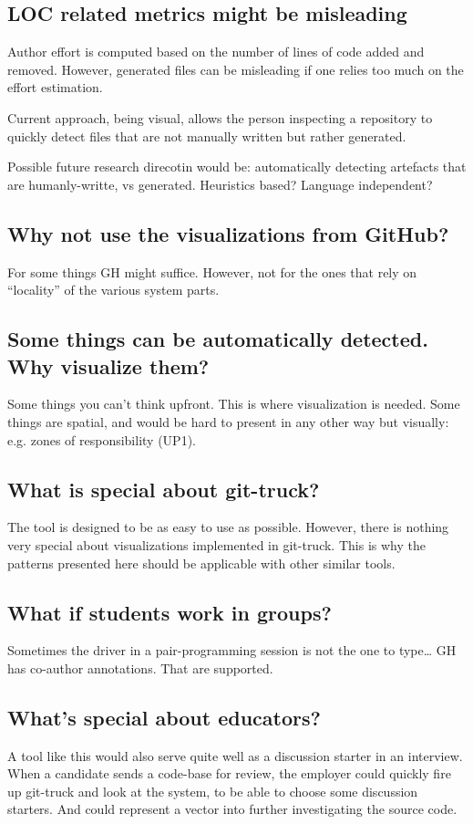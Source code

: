 \documentclass[conference]{IEEEtran}
\begin{document}
\subsection{LOC related metrics might be misleading}
Author effort is computed based on the number of lines of code added and removed. However, generated files can be misleading if one relies too much on the effort estimation. 

Current approach, being visual, allows the person inspecting a repository to quickly detect files that are not manually written but rather generated. 

Possible future research direcotin would be: automatically detecting artefacts that are humanly-writte, vs generated. Heuristics based? Language independent?

\subsection{Why not use the visualizations from GitHub?}
For some things GH might suffice. However, not for the ones that rely on “locality” of the various system parts. 

\subsection{Some things can be automatically detected. Why visualize them?}
Some things you can’t think upfront. This is where visualization is needed.
Some things are spatial, and would be hard to present in any other way but visually: e.g. zones of responsibility (UP1). 

\subsection{What is special about git-truck?}
The tool is designed to be as easy to use as possible. However, there is nothing very special about visualizations implemented in git-truck. This is why the patterns presented here should be applicable with other similar tools.

\subsection{What if students work in groups?}
Sometimes the driver in a pair-programming session is not the one to type… GH has co-author annotations. That are supported. 


\subsection{What’s special about educators?}
A tool like this would also serve quite well as a discussion starter in an interview. When a candidate sends a code-base for review, the employer could quickly fire up git-truck and look at the system, to be able to choose some discussion starters. And could represent a vector into further investigating the source code. 





\end{document}
